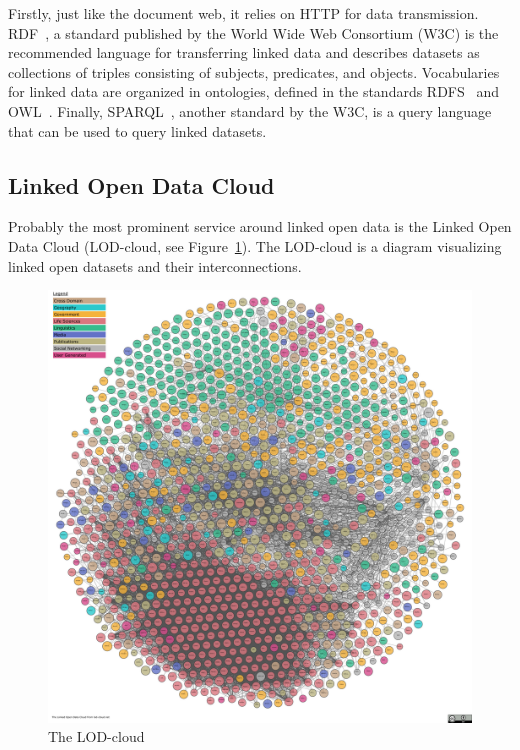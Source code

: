 \documentclass[runningheads]{llncs}
\begin{document}
    Firstly, just like the document web, it relies on HTTP for data transmission.
    RDF~\citep{RDF}, a standard published by the World Wide Web Consortium (W3C) is the recommended language for transferring linked data and describes datasets as collections of triples consisting of subjects, predicates, and objects.
    Vocabularies for linked data are organized in ontologies, defined in the standards RDFS~\citep{RDFS} and OWL~\citep{OWL}.
    Finally, SPARQL~\citep{SPARQL}, another standard by the W3C, is a query language that can be used to query linked datasets.

    \subsection{Linked Open Data Cloud}
    Probably the most prominent service around linked open data is the Linked Open Data Cloud\footnotemark{} (LOD-cloud, see Figure~\ref{fig:lod_cloud}).
    The LOD-cloud is a diagram visualizing linked open datasets and their interconnections.

    \begin{figure}[ht]
        \centering
        \includegraphics[width=\textwidth]{figures/lod-cloud-sm}
        \caption{The LOD-cloud\protect\footnotemark[\value{footnote}]}
        \label{fig:lod_cloud}
    \end{figure}
\end{document}
